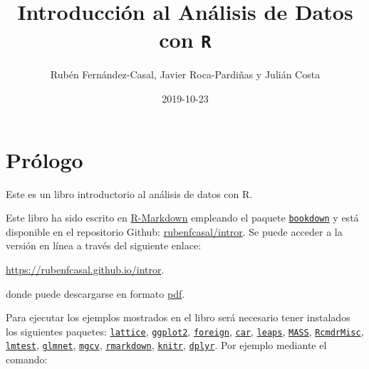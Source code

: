 \documentclass[]{book}
\title{Introducción al Análisis de Datos con \texttt{R}}
\author{Rubén Fernández-Casal, Javier Roca-Pardiñas y Julián Costa}
\date{2019-10-23}
\begin{document}
\maketitle

{
\setcounter{tocdepth}{1}
\tableofcontents
}
\chapter*{Prólogo}\label{prologo}

Este es un libro introductorio al análisis de datos con R.

Este libro ha sido escrito en
\href{http://rmarkdown.rstudio.com}{R-Markdown} empleando el paquete
\href{https://bookdown.org/yihui/bookdown/}{\texttt{bookdown}} y está
disponible en el repositorio Github:
\href{https://github.com/rubenfcasal/book_remuestreo}{rubenfcasal/intror}.
Se puede acceder a la versión en línea a través del siguiente enlace:

\url{https://rubenfcasal.github.io/intror}.

donde puede descargarse en formato
\href{https://rubenfcasal.github.io/intror/Intro_Analisis_Datos_R.pdf}{pdf}.

Para ejecutar los ejemplos mostrados en el libro será necesario tener
instalados los siguientes paquetes:
\href{https://cran.r-project.org/web/packages/lattice/index.html}{\texttt{lattice}},
\href{https://cran.r-project.org/web/packages/ggplot2/index.html}{\texttt{ggplot2}},
\href{https://cran.r-project.org/web/packages/foreign/index.html}{\texttt{foreign}},
\href{https://cran.r-project.org/web/packages/car/index.html}{\texttt{car}},
\href{https://cran.r-project.org/web/packages/leaps/index.html}{\texttt{leaps}},
\href{https://cran.r-project.org/web/packages/MASS/index.html}{\texttt{MASS}},
\href{https://cran.r-project.org/web/packages/RcmdrMisc/index.html}{\texttt{RcmdrMisc}},
\href{https://cran.r-project.org/web/packages/lmtest/index.html}{\texttt{lmtest}},
\href{https://cran.r-project.org/web/packages/glmnet/index.html}{\texttt{glmnet}},
\href{https://cran.r-project.org/web/packages/mgcv/index.html}{\texttt{mgcv}},
\href{https://cran.r-project.org/web/packages/rmarkdown/index.html}{\texttt{rmarkdown}},
\href{https://cran.r-project.org/web/packages/knitr/index.html}{\texttt{knitr}},
\href{https://cran.r-project.org/web/packages/dplyr/index.html}{\texttt{dplyr}}.
Por ejemplo mediante el comando:
\end{document}
